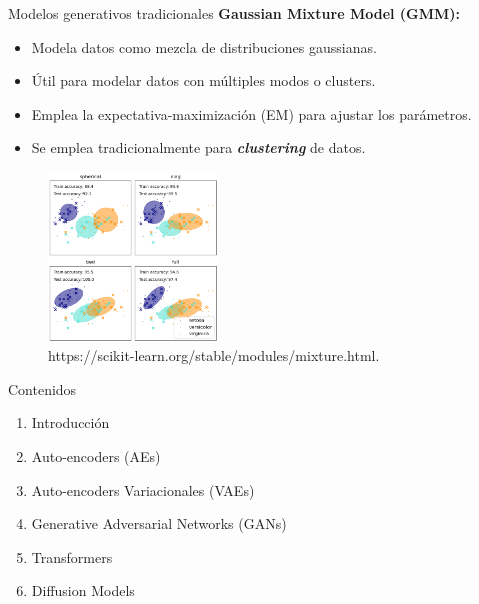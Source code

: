




\begin{frame}{Modelos generativos tradicionales}
\textbf{Gaussian Mixture Model (GMM):}
    \begin{itemize}
        \item Modela datos como mezcla de distribuciones gaussianas.
        \item Útil para modelar datos con múltiples modos o clusters.
        \item Emplea la expectativa-maximización (EM) para ajustar los parámetros.
        \item Se emplea tradicionalmente para \textit{\textbf{clustering}} de datos.
    \end{itemize}

    \begin{figure}
    \centering
    \includegraphics[width=0.4\textwidth]{Slides/figures/02_Metodos_Generativos/2.1. gmm cov.png}
    \caption{https://scikit-learn.org/stable/modules/mixture.html.}
    \end{figure}

\end{frame}


\begin{frame}{Contenidos}
  \begin{enumerate}
      \item Introducción
      \item Auto-encoders (AEs)
      \item{Auto-encoders Variacionales (VAEs)}
      \item{Generative Adversarial Networks (GANs)}
      \item{Transformers}
      \item{Diffusion Models}
    \end{enumerate}
\end{frame}


\iffalse

